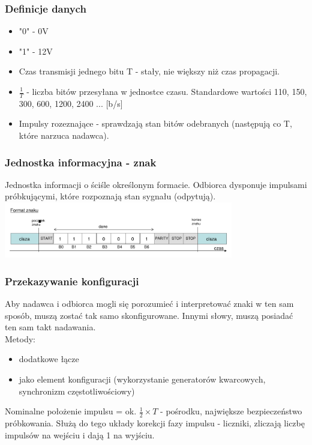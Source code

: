 		\subsubsection{Definicje danych}
		\begin{itemize}
			\item "0" - 0V
			\item "1" - 12V
			\item Czas transmisji jednego bitu T - stały, nie większy niż czas propagacji.
			\item $\frac{1}{T}$ - liczba bitów przesyłana w jednostce czasu. Standardowe wartości 110, 150, 300, 600, 1200, 2400 ... [b/s]
			\item Impulsy rozeznające - sprawdzają stan bitów odebranych (następują co T, które narzuca nadawca).
		\end{itemize}
		\subsubsection{Jednostka informacyjna - znak}
		Jednostka informacji o ściśle określonym formacie. Odbiorca dysponuje impulsami próbkującymi, które rozpoznają stan sygnału (odpytują).\\
		\includegraphics[width=10cm]{./wyklady/RS232_3_2.pdf}\\
		\subsubsection{Przekazywanie konfiguracji}
			Aby nadawca i odbiorca mogli się porozumieć i interpretować znaki w ten sam sposób, muszą zostać tak samo skonfigurowane. Innymi słowy, muszą posiadać ten sam takt nadawania.\\Metody:\\
			\begin{itemize}
				\item dodatkowe łącze
				\item jako element konfiguracji (wykorzystanie generatorów kwarcowych, synchronizm częstotliwościowy)
			\end{itemize}
			Nominalne położenie impulsu = ok. $\frac{1}{2}\times{T}$ - pośrodku, największe bezpieczeństwo próbkowania. Służą do tego układy korekcji fazy impulsu - liczniki, zliczają liczbę impulsów na wejściu i dają 1 na wyjściu.
